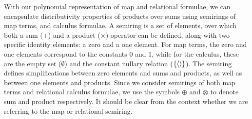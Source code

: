 

With our polynomial representation of map and relational formulae, we can
encapsulate distributivity properties of products over sums using semirings
of map terms, and calculus formulae. A semiring is a set of elements, over which
both a sum ($+$) and a product ($\times$) operator can be defined, along with
two specific identity elements: a zero and a one element. For map terms, the
zero and one elements correspond to the constants 0 and 1, while for the
calculus, these are the empty set ($\emptyset$) and the constant nullary
relation ($\{{\langle\rangle}\}$). The semiring defines simplifications between zero
elements and sums and products, as well as between one elements and products.
Since we consider semirings of both map terms and relational calculus formulae,
we use the symbols $\oplus$ and $\otimes$ to denote sum and product
respectively. It should be clear from the context whether we are referring
to the map or relational semiring.

